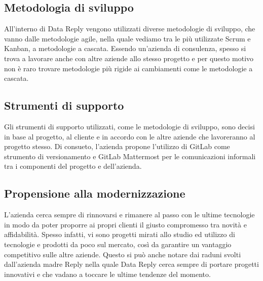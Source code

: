 \subsection{Metodologia di sviluppo}
All'interno di Data Reply vengono utilizzati diverse metodologie di sviluppo, che vanno dalle metodologie agile, nella quale vediamo tra le più utilizzate \gls{Scrum} e \gls{Kanban}, a metodologie a cascata. Essendo un'azienda di consulenza, spesso si trova a lavorare anche con altre aziende allo stesso progetto e per questo motivo non è raro trovare metodologie più rigide ai cambiamenti come le metodologie a cascata.
\subsection{Strumenti di supporto}
Gli strumenti di supporto utilizzati, come le metodologie di sviluppo,  sono decisi in base al progetto, al cliente e in accordo con le altre aziende che lavoreranno al progetto stesso.
Di consueto, l'azienda propone l'utilizzo di \gls{GitLab} come strumento di versionamento e \gls{GitLab Mattermost} per le comunicazioni informali tra i componenti del progetto e dell'azienda.
\subsection{Propensione alla modernizzazione}
L'azienda cerca sempre di rinnovarsi e rimanere al passo con le ultime tecnologie in modo da poter proporre ai propri clienti il giusto compromesso tra novità e affidabilità. Spesso infatti, vi sono progetti mirati allo studio ed utilizzo di tecnologie e prodotti da poco sul mercato, così da garantire un vantaggio competitivo sulle altre aziende.
Questo si può anche notare dai raduni svolti dall'azienda madre Reply nella quale Data Reply cerca sempre di portare progetti innovativi e che vadano a toccare le ultime tendenze del momento.
